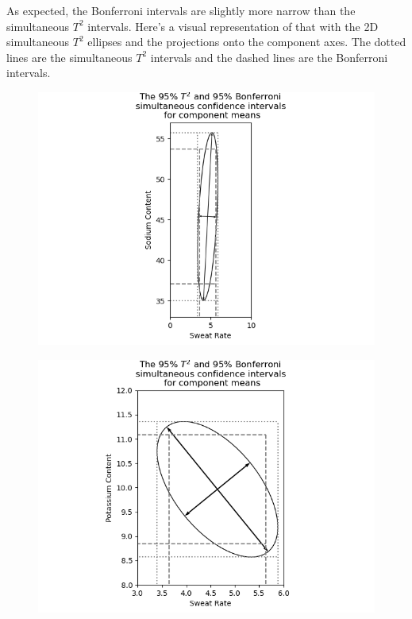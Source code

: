 As expected, the Bonferroni intervals are slightly more narrow than the simultaneous $T^{2}$ intervals.
Here's a visual representation of that with the 2D simultaneous $T^{2}$ ellipses and the projections onto the component axes. The dotted lines are the simultaneous $T^{2}$ intervals and the dashed lines are the Bonferroni intervals.

\begin{figure}[H]
    \centering
    \includegraphics[scale=0.75]{./python/chapter-5/Question-5-7-CI-Sweat-Sodium.png}
\end{figure}

\begin{figure}[H]
    \centering
    \includegraphics[scale=0.75]{./python/chapter-5/Question-5-7-CI-Sweat-Potassium.png}
\end{figure}

